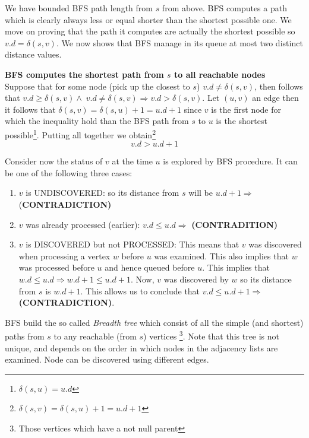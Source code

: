 We have bounded BFS path length from $s$ from above. BFS computes a path which is clearly always less or equal shorter than the shortest possible one. We move on proving that the path it computes are actually the shortest possible so $v.d = \delta(s,v)$.
We now shows that BFS manage in its queue at most two distinct distance values.

\begin{theorem}{\textbf{BFS computes the shortest path from $s$ to all reachable nodes}\hfill \\}
Suppose that for some node (pick up the closest to $s$) $v.d \neq \delta(s,v)$,  then follows that $v.d \geq \delta(s,v)  \wedge \; v.d \neq \delta(s,v) \Rightarrow  v.d > \delta(s,v) $. Let $(u,v)$ an edge then it follows that $\delta(s,v) = \delta(s,u) + 1 = u.d +1$ since $v$ is the first node for which the inequality hold than the BFS path from $s$ to $u$ is the shortest possible\footnote{$\delta(s,u) = u.d$}.
Putting all together we obtain\footnote{$\delta(s,v) = \delta(s,u) + 1 = u.d +1$} 
\[
v.d > u.d + 1 
\]

Consider now the status of $v$ at the time $u$ is explored by BFS procedure. It can be one of the following three cases:
\begin{enumerate}
\item $v$ is UNDISCOVERED: so its distance from $s$ will be $u.d +1 \Rightarrow$ (\textbf{CONTRADICTION)}
\item $v$ was already processed (earlier): $v.d \leq u.d \Rightarrow$ \textbf{(CONTRADITION)}
\item $v$ is DISCOVERED but not PROCESSED: This means that $v$ was discovered when processing a vertex $w$ before $u$ was examined. This also implies that $w$ was processed before $u$ and hence queued before $u$. This implies that $ w.d \leq u.d \Rightarrow w.d+1 \leq u.d +1$. Now, $v$ was discovered by $w$ so its distance from $s$ is $w.d+1$. This allows us to conclude that $v.d \leq u.d+1 \Rightarrow$\textbf{(CONTRADICTION)}.
\end{enumerate}
\end{theorem}

BFS build the so called \textit{Breadth tree} which consist of all the simple (and shortest) paths from $s$ to any reachable (from $s$) vertices \footnote{Those vertices which have a not null parent}. Note that this tree is not unique, and depends on the order in which nodes in the adjacency lists are examined. Node can be discovered using different edges.


